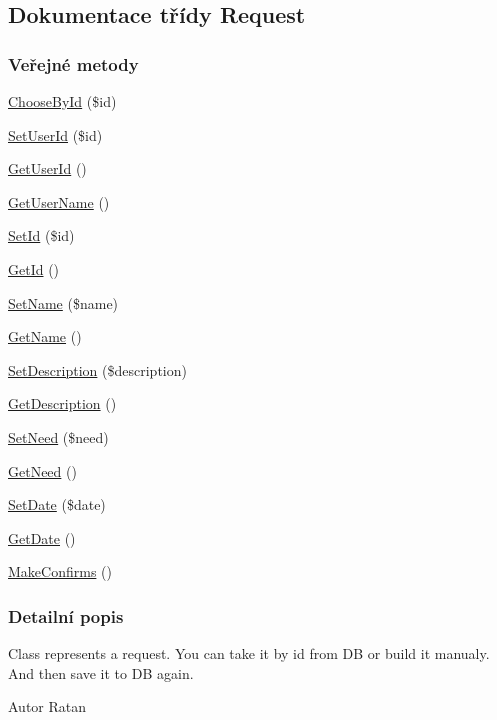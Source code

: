 \hypertarget{class_request}{\subsection{Dokumentace třídy Request}
\label{class_request}
}
\subsubsection*{Veřejné metody}
\begin{DoxyCompactItemize}
\item 
\hyperlink{class_request_acb45c1bd5a1e720a43eb5c71735515ea}{Choose\-By\-Id} (\$id)
\item 
\hyperlink{class_request_a62ba6b8279558b2634fd0575766d102c}{Set\-User\-Id} (\$id)
\item 
\hyperlink{class_request_aa2fb280d6222b804a5410138f46a960d}{Get\-User\-Id} ()
\item 
\hyperlink{class_request_a8b542e7d4822ef364eeb9e5afe09681b}{Get\-User\-Name} ()
\item 
\hyperlink{class_request_ad7e9f35fc378d9f489cec80da1cf8d56}{Set\-Id} (\$id)
\item 
\hyperlink{class_request_a925f70750cae477ebd3a3fc44ea813b0}{Get\-Id} ()
\item 
\hyperlink{class_request_a6cb58cdc5c901fa449a05806fb1672ea}{Set\-Name} (\$name)
\item 
\hyperlink{class_request_a557b5270c9e0ba9a1669eb216b929aaa}{Get\-Name} ()
\item 
\hyperlink{class_request_acf2c28a3add3240da08675f81a3dcfcc}{Set\-Description} (\$description)
\item 
\hyperlink{class_request_ac5bebc81027895d2eb4591032080ec6d}{Get\-Description} ()
\item 
\hyperlink{class_request_a35f911475750f19a879ea6b71959f808}{Set\-Need} (\$need)
\item 
\hyperlink{class_request_acec0c5370ef395c5da9ed499dab11747}{Get\-Need} ()
\item 
\hyperlink{class_request_a1ae4a9e4b18c64b28c19b867a5970eac}{Set\-Date} (\$date)
\item 
\hyperlink{class_request_a22b9925d94f2831416772c3f54612eb0}{Get\-Date} ()
\item 
\hyperlink{class_request_a02a42600bab107d0d6b8613501a875f2}{Make\-Confirms} ()
\end{DoxyCompactItemize}


\subsubsection{Detailní popis}
Class represents a request. You can take it by id from D\-B or build it manualy. And then save it to D\-B again. \begin{DoxyAuthor}{Autor}
Ratan 
\end{DoxyAuthor}


